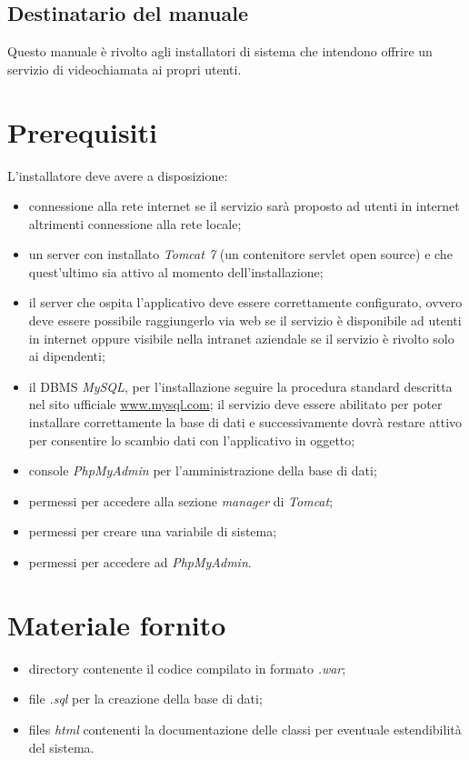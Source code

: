 \subsection{Destinatario del manuale}
Questo manuale è rivolto agli installatori di sistema che intendono offrire un servizio di videochiamata ai propri utenti.

\section{Prerequisiti}
L'installatore deve avere a disposizione:
\begin{itemize}
	\item connessione alla rete internet se il servizio sarà proposto ad utenti in internet altrimenti connessione alla rete locale;
	\item un server con installato \textit{Tomcat 7} (un contenitore servlet open source) e che 		quest'ultimo sia attivo al momento dell'installazione;
	\item il server che ospita l'applicativo deve essere correttamente configurato, ovvero deve essere possibile raggiungerlo via web se il servizio è disponibile ad utenti in internet oppure visibile nella intranet aziendale se il servizio è rivolto solo ai dipendenti;
	\item il DBMS \textit{MySQL}, per l'installazione seguire la procedura standard descritta nel sito ufficiale \url{www.mysql.com}; il servizio deve essere abilitato per poter installare correttamente la base di dati e successivamente dovrà restare attivo per consentire lo scambio dati con l'applicativo in oggetto;
	\item console \textit{PhpMyAdmin} per l'amministrazione della base di dati;
	\item permessi per accedere alla sezione \textit{manager} di \textit{Tomcat};
	\item permessi per creare una variabile di sistema;
	\item permessi per accedere ad \textit{PhpMyAdmin}.
\end{itemize} 

\section{Materiale fornito}
\begin{itemize}
\item directory \caName{} contenente il codice compilato in formato \textit{.war};
\item file \textit{.sql} per la creazione della base di dati;
\item files \textit{html} contenenti la documentazione delle classi per eventuale estendibilità del sistema.
\end{itemize} 

